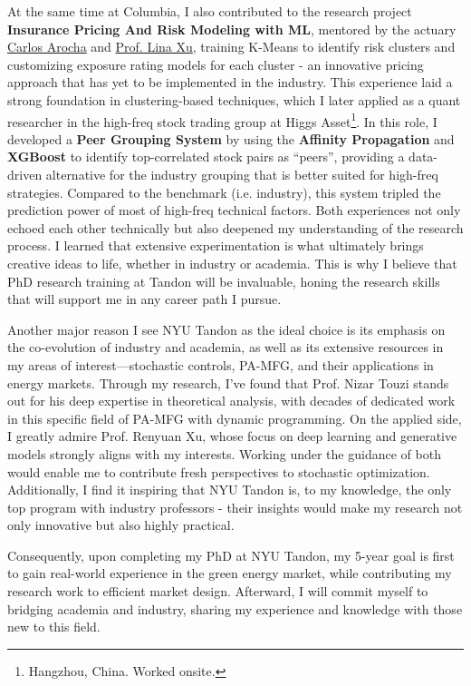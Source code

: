 \documentclass[12pt, a4paper]{article}
\newcommand{\InsurP}{Insurance Pricing And Risk Modeling with ML\xspace}
\newcommand{\Higgs}{Higgs Asset\footnote{Hangzhou, China. Worked onsite.}\xspace}
\newcommand{\CA}{\href{https://www.linkedin.com/in/carocha/?originalSubdomain=ch}{Carlos Arocha}\xspace}
\newcommand{\LX}{\href{https://sps.columbia.edu/person/lina-xu}{Prof. Lina Xu}}
\begin{document}
At the same time at Columbia, I also contributed to the research project \textbf{\InsurP}, mentored by the actuary \CA and \LX, training K-Means to identify risk clusters and customizing exposure rating models for each cluster - an innovative pricing approach that has yet to be implemented in the industry. This experience laid a strong foundation in clustering-based techniques, which I later applied as a quant researcher in the high-freq stock trading group at \Higgs. In this role, I developed a \textbf{Peer Grouping System} by using the \textbf{Affinity Propagation} and \textbf{XGBoost} to identify top-correlated stock pairs as “peers”, providing a data-driven alternative for the industry grouping that is better suited for high-freq strategies. Compared to the benchmark (i.e. industry), this system tripled the prediction power of most of high-freq technical factors. Both experiences not only echoed each other technically but also deepened my understanding of the research process. I learned that extensive experimentation is what ultimately brings creative ideas to life, whether in industry or academia. This is why I believe that PhD research training at Tandon will be invaluable, honing the research skills that will support me in any career path I pursue.

Another major reason I see NYU Tandon as the ideal choice is its emphasis on the co-evolution of industry and academia, as well as its extensive resources in my areas of interest—stochastic controls, PA-MFG, and their applications in energy markets. Through my research, I’ve found that Prof. Nizar Touzi stands out for his deep expertise in theoretical analysis, with decades of dedicated work in this specific field of PA-MFG with dynamic programming. On the applied side, I greatly admire Prof. Renyuan Xu, whose focus on deep learning and generative models strongly aligns with my interests. Working under the guidance of both would enable me to contribute fresh perspectives to stochastic optimization. Additionally, I find it inspiring that NYU Tandon is, to my knowledge, the only top program with industry professors - their insights would make my research not only innovative but also highly practical.


Consequently, upon completing my PhD at NYU Tandon, my 5-year goal is first to gain real-world experience in the green energy market, while contributing my research work to efficient market design. Afterward, I will commit myself to bridging academia and industry, sharing my experience and knowledge with those new to this field.
\end{document}
